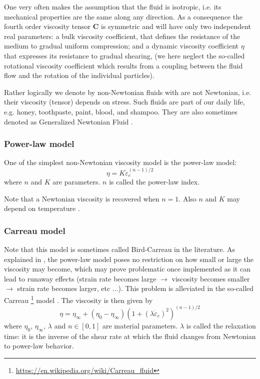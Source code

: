 One very often makes the assumption that the fluid is isotropic, i.e. its mechanical properties are the 
same along any direction. As a consequence the fourth order viscosity tensor 
${\bm C}$ is symmetric and will have only two independent real parameters: 
a bulk viscosity coefficient, that defines the resistance of the medium to gradual uniform compression; 
and a dynamic viscosity coefficient $\eta$ that expresses its resistance to gradual shearing, 
(we here neglect the so-called rotational viscosity coefficient which results from a coupling between the fluid flow and the rotation of the individual particles). %

Rather logically we denote by non-Newtonian fluids with are not Newtonian, i.e. their viscosity (tensor)
depends on stress. Such fluids are part of our daily life, e.g. honey, toothpaste, paint, blood, and shampoo.
They are also sometimes denoted as Generalized Newtonian Fluid . 
 


\subsubsection{Power-law model \label{ss:powerlaw}} 

One of the simplest non-Newtonian viscosity model is the power-law model:
\begin{equation}
\eta = K \dot{\varepsilon}_{e}^{(n-1)/2}
\end{equation}
where $n$ and $K$ are parameters. $n$ is called the power-law index.

Note that a Newtonian viscosity is recovered when $n=1$. Also $n$ and $K$ may depend on temperature
\cite[p339]{reddybook2}.

\Literature \cite{enmo97}

\subsubsection{Carreau model}

Note that this model is sometimes called Bird-Carreau in the literature. 
As explained in \cite{reddybook2}, the power-law model poses no restriction on 
how small or large the viscosity may become, which may prove problematic once 
implemented as it can lead to runaway effects (strain rate becomes large $\rightarrow$
viscosity becomes smaller $\rightarrow$ strain rate becomes larger, etc ...).
This problem is alleviated in the so-called Carreau
\footnote{\url{https://en.wikipedia.org/wiki/Carreau_fluid}} model \cite{zifr07}. 
The viscosity is then given by
\begin{equation}
\eta = \eta_\infty + (\eta_0-\eta_\infty) \left(1 + (\lambda \dot{\varepsilon}_{e})^2 \right)^{(n-1)/2}
\end{equation}
where $\eta_0$, $\eta_\infty$, $\lambda$ and $n\in[0,1]$ are material parameters. 
$\lambda$ is called the relaxation time: it is the inverse of the shear rate at which 
the fluid changes from Newtonian to power-law behavior.

